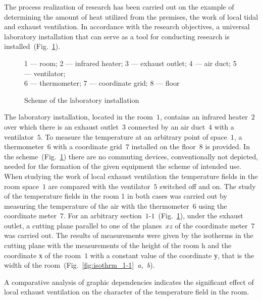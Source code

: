 \documentclass[12pt,twoside]{article}
\newcommand{\FigRef}[2][]{(Fig.~\ref{#2}\textit{#1})}
\begin{document}
\begin{JGGarticle}
			The process realization of research has been carried out on the example of determining the amount of heat utilized from the premises, the work of local tidal and exhaust ventilation. In accordance with the research objectives, a universal laboratory installation that can serve as a tool for conducting research is installed~\FigRef{fig:labinst}.
			\begin{figure}[!hbt]
				\caption{Scheme of the laboratory installation}
				\begin{center}
					1 --- room; 2 --- infrared heater; 3 --- exhaust outlet; 4 --- air duct; 5 --- ventilator;\\6 --- thermometer; 7 --- coordinate grid; 8 --- floor
				\end{center}
				\label{fig:labinst}
			\end{figure}
			The laboratory installation, located in the room~$1$, contains an infrared heater~$2$ over which there is an exhaust outlet~$3$ connected by an air duct~$4$ with a ventilator~$5$. To measure the temperature at an arbitrary point of space~$1$, a thermometer~$6$ with a coordinate grid~$7$ installed on the floor~$8$ is provided. In the scheme~\FigRef{fig:labinst} there are no commuting devices, conventionally not depicted, needed for the formation of the given equipment the scheme of intended use.
			When studying the work of local exhaust ventilation the temperature fields in the room space~$1$ are compared with the ventilator~$5$ switched off and on. The study of the temperature fields in the room 1 in both cases was carried out by measuring the temperature of the air with the thermometer~$6$ using the coordinate meter~$7$. For an arbitrary section~$1\text{-}1$~\FigRef{fig:labinst}, under the exhaust outlet, a cutting plane parallel to one of the planes~$xz$ of the coordinate meter~$7$ was carried out. The results of measurements were given by the isotherms in the cutting plane with the measurements of the height of the room h and the coordinate х of the room~$1$ with a constant value of the coordinate у, that is the width of the room~\FigRef[~a,~b]{fig:isothrm_1-1}.
			
			A comparative analysis of graphic dependencies indicates the significant effect of local exhaust ventilation on the character of the temperature field in the room.
			

\end{JGGarticle}
\end{document}
